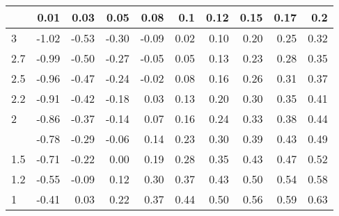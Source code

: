 
\begin{tabular}{lrrrrrrrrr}
\toprule
  & 0.01 & 0.03 & 0.05 & 0.08 & 0.1 & 0.12 & 0.15 & 0.17 & 0.2\\
\midrule
3 & -1.02 & -0.53 & -0.30 & -0.09 & 0.02 & 0.10 & 0.20 & 0.25 & 0.32\\
2.7 & -0.99 & -0.50 & -0.27 & -0.05 & 0.05 & 0.13 & 0.23 & 0.28 & 0.35\\
2.5 & -0.96 & -0.47 & -0.24 & -0.02 & 0.08 & 0.16 & 0.26 & 0.31 & 0.37\\
2.2 & -0.91 & -0.42 & -0.18 & 0.03 & 0.13 & 0.20 & 0.30 & 0.35 & 0.41\\
2 & -0.86 & -0.37 & -0.14 & 0.07 & 0.16 & 0.24 & 0.33 & 0.38 & 0.44\\
\addlinespace
1.7 & -0.78 & -0.29 & -0.06 & 0.14 & 0.23 & 0.30 & 0.39 & 0.43 & 0.49\\
1.5 & -0.71 & -0.22 & 0.00 & 0.19 & 0.28 & 0.35 & 0.43 & 0.47 & 0.52\\
1.2 & -0.55 & -0.09 & 0.12 & 0.30 & 0.37 & 0.43 & 0.50 & 0.54 & 0.58\\
1 & -0.41 & 0.03 & 0.22 & 0.37 & 0.44 & 0.50 & 0.56 & 0.59 & 0.63\\
\bottomrule
\end{tabular}
